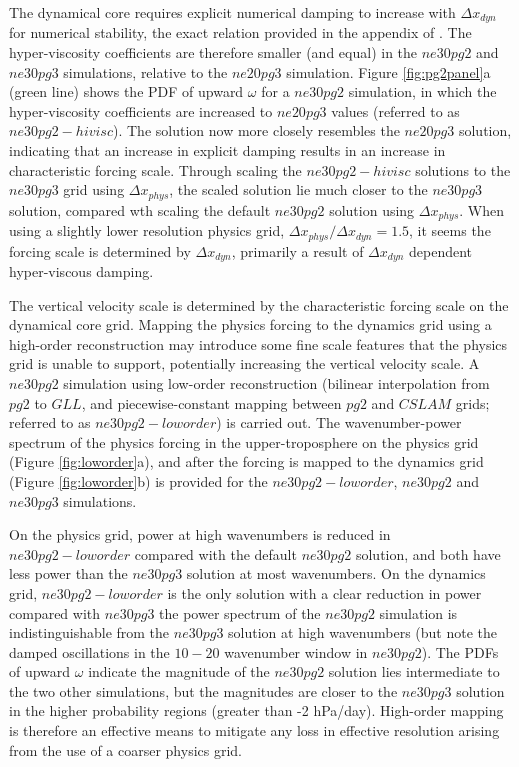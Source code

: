 \documentclass{agujournal}
\begin{document}
The dynamical core requires explicit numerical damping to increase with $\Delta x_{dyn}$ for numerical stability, the exact relation provided in the appendix of \cite{LetAl2018JAMES}. The hyper-viscosity coefficients are therefore smaller (and equal) in the $ne30pg2$ and $ne30pg3$ simulations, relative to the $ne20pg3$ simulation. Figure \ref{fig:pg2panel}a (green line) shows the PDF of upward $\omega$ for a $ne30pg2$ simulation, in which the hyper-viscosity coefficients are increased to $ne20pg3$ values (referred to as $ne30pg2-hivisc$). The solution now more closely resembles the $ne20pg3$ solution, indicating that an increase in explicit damping results in an increase in characteristic forcing scale. Through scaling the $ne30pg2-hivisc$ solutions to the $ne30pg3$ grid using $\Delta x_{phys}$, the scaled solution lie much closer to the $ne30pg3$ solution, compared wth scaling the default $ne30pg2$ solution using $\Delta x_{phys}$. When using a slightly lower resolution physics grid, $\Delta x_{phys}/\Delta x_{dyn} = 1.5$, it seems the forcing scale is determined by $\Delta x_{dyn}$, primarily a result of $\Delta x_{dyn}$ dependent hyper-viscous damping.

The vertical velocity scale is determined by the characteristic forcing scale on the dynamical core grid. Mapping the physics forcing to the dynamics grid using a high-order reconstruction may introduce some fine scale features that the physics grid is unable to support, potentially increasing the vertical velocity scale. A $ne30pg2$ simulation using low-order reconstruction (bilinear interpolation from $pg2$ to $GLL$, and piecewise-constant mapping between $pg2$ and $CSLAM$ grids; referred to as $ne30pg2-loworder$) is carried out. The wavenumber-power spectrum of the physics forcing in the upper-troposphere on the physics grid (Figure \ref{fig:loworder}a), and after the forcing is mapped to the dynamics grid (Figure \ref{fig:loworder}b) is provided for the $ne30pg2-loworder$, $ne30pg2$ and $ne30pg3$ simulations. 

On the physics grid, power at high wavenumbers is reduced in $ne30pg2-loworder$ compared with the default $ne30pg2$ solution, and both have less power than the $ne30pg3$ solution at most wavenumbers. On the dynamics grid, $ne30pg2-loworder$ is the only solution with a clear reduction in power compared with $ne30pg3$ \textemdash the power spectrum of the $ne30pg2$ simulation is indistinguishable from the $ne30pg3$ solution at high wavenumbers (but note the damped oscillations in the $10-20$ wavenumber window in $ne30pg2$). The PDFs of upward $\omega$ indicate the magnitude of the $ne30pg2$ solution lies intermediate to the two other simulations, but the magnitudes are closer to the $ne30pg3$ solution in the higher probability regions (greater than -2 hPa/day). High-order mapping is therefore an effective means to mitigate any loss in effective resolution arising from the use of a coarser physics grid.
\end{document}
